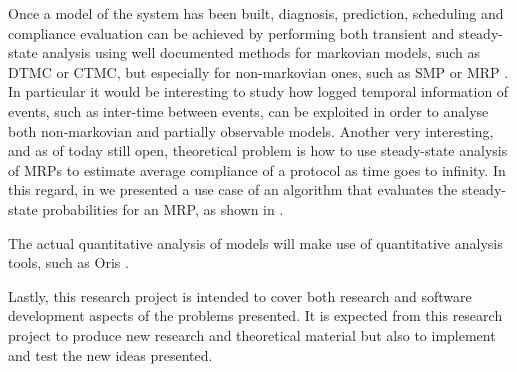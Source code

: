 \documentclass{article}
\begin{document}
        Once a model of the system has been built, diagnosis, prediction, scheduling and compliance evaluation can be achieved by performing both transient and steady-state analysis using well documented methods for markovian models, such as DTMC or CTMC, but especially for non-markovian ones, such as SMP or MRP \cite{logothetis1995markov, horvath2012transient}. In particular it would be interesting to study how logged temporal information of events, such as inter-time between events, can be exploited in order to analyse both non-markovian and partially observable models. Another very interesting, and as of today still open, theoretical problem is how to use steady-state analysis of MRPs to estimate average compliance of a protocol as time goes to infinity. In this regard, in \cite{mascots16} we presented a use case of an algorithm that evaluates the steady-state probabilities for an MRP, as shown in \cite{logothetis1995markov}.
        
        The actual quantitative analysis of models will make use of quantitative analysis tools, such as Oris \cite{bucci2010oris}.
        
        Lastly, this research project is intended to cover both research and software development aspects of the problems presented. It is expected from this research project to produce new research and theoretical material but also to implement and test the new ideas presented.
    
    \clearpage
    
	
	
\end{document}
